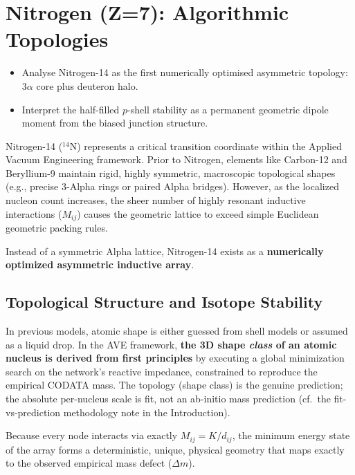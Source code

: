 \chapter{Nitrogen (Z=7): Algorithmic Topologies}


\begin{objectivebox}
\begin{itemize}
    \item Analyse Nitrogen-14 as the first numerically optimised asymmetric topology: $3\alpha$ core plus deuteron halo.
    \item Interpret the half-filled $p$-shell stability as a permanent geometric dipole moment from the biased junction structure.
\end{itemize}
\end{objectivebox}

Nitrogen-14 ($^{14}\text{N}$) represents a critical transition coordinate within the Applied Vacuum Engineering framework. Prior to Nitrogen, elements like Carbon-12 and Beryllium-9 maintain rigid, highly symmetric, macroscopic topological shapes (e.g., precise 3-Alpha rings or paired Alpha bridges). However, as the localized nucleon count increases, the sheer number of highly resonant inductive interactions ($M_{ij}$) causes the geometric lattice to exceed simple Euclidean geometric packing rules.

Instead of a symmetric Alpha lattice, Nitrogen-14 exists as a \textbf{numerically optimized asymmetric inductive array}. 

\section{Topological Structure and Isotope Stability}
In previous models, atomic shape is either guessed from shell models or assumed as a liquid drop. In the AVE framework, \textbf{the 3D shape \emph{class} of an atomic nucleus is derived from first principles} by executing a global minimization search on the network's reactive impedance, constrained to reproduce the empirical CODATA mass. The topology (shape class) is the genuine prediction; the absolute per-nucleus scale is fit, not an ab-initio mass prediction (cf.\ the fit-vs-prediction methodology note in the Introduction).

Because every node interacts via exactly $M_{ij} = K / d_{ij}$, the minimum energy state of the array forms a deterministic, unique, physical geometry that maps exactly to the observed empirical mass defect ($\Delta m$). 

